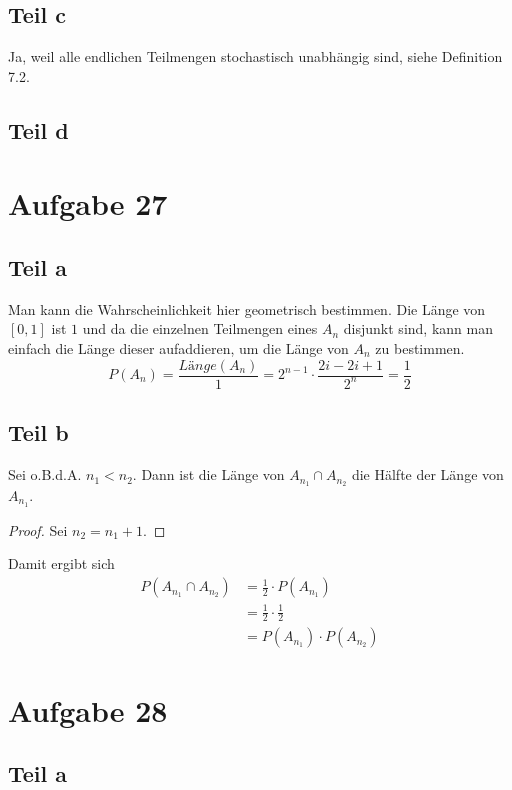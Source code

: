 \documentclass[10pt,a4paper]{article}
\begin{document}
\subsection{Teil c}
Ja, weil alle endlichen Teilmengen stochastisch unabhängig sind, siehe Definition 7.2.

\subsection{Teil d}


\section{Aufgabe 27}

\subsection{Teil a}
Man kann die Wahrscheinlichkeit hier geometrisch bestimmen.
Die Länge von $[0, 1]$ ist $1$ und da die einzelnen Teilmengen eines $A_{n}$ disjunkt sind, kann man einfach die Länge dieser aufaddieren, um die Länge von $A_{n}$ zu bestimmen.
\begin{equation}
  P(A_{n}) = \frac{\textit{Länge}(A_{n})}{1} = 2^{n - 1} \cdot \frac{2i - 2i + 1}{2^{n}} = \frac{1}{2}
\end{equation}

\subsection{Teil b}
Sei o.B.d.A. $n_{1} < n_{2}$.
Dann ist die Länge von $A_{n_{1}} \cap A_{n_{2}}$ die Hälfte der Länge von $A_{n_{1}}$.
\begin{proof}
  Sei $n_{2} = n_{1} + 1$.

\end{proof}
Damit ergibt sich
\begin{align*}
  P(A_{n_{1}} \cap A_{n_{2}}) & = \frac{1}{2} \cdot P(A_{n_{1}})\\
  & = \frac{1}{2} \cdot \frac{1}{2}\\
  & = P(A_{n_{1}}) \cdot P(A_{n_{2}})
\end{align*}

\section{Aufgabe 28}

\subsection{Teil a}
\end{document}
